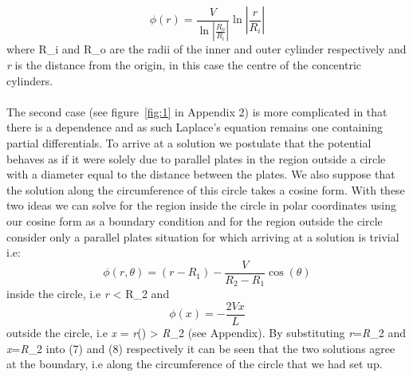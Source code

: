 \documentclass{article}
\begin{document}
\begin{equation}
\phi(r)=\frac{V}{\ln\left|\frac{R_o}{R_i}\right|}\ln\left|\frac{r}{R_i}\right|
\label{29}
\end{equation}
where R_i\) and R_o\) are the radii of the inner and outer cylinder respectively and \textit{r} is the distance from the origin, in this case the centre of the concentric cylinders. \\
\\
The second case (see figure~\ref{fig:1} in Appendix 2) is more complicated in that there is a \theta\) dependence and as such Laplace's equation remains one containing partial differentials. To arrive at a solution we postulate that the potential behaves as if it were solely due to parallel plates in the region outside a circle with a diameter equal to the distance between the plates. We also suppose that the solution along the circumference of this circle takes a cosine form. With these two ideas we can solve for the region inside the circle in polar coordinates using our cosine form as a boundary condition and for the region outside the circle consider only a parallel plates situation for which arriving at a solution is trivial i.e: 
\begin{equation}
\phi(r,\theta)=(r-R_1)-\frac{V}{R_2-R_1}\cos(\theta)
\label{}
\end{equation}
inside the circle, i.e \textit{r} < R_2\) and
\begin{equation}
\phi(x)=-\frac{2Vx}{L}
\label{}
\end{equation}
outside the circle, i.e \textit{x} = \textit{r}\cos(\theta)\) > \textit{R}_2\) (see Appendix). By substituting \textit{r}=\textit{R}_2\) and \textit{x}=\textit{R}_2\cos\theta\) into (7) and (8) respectively it can be seen that the two solutions agree at the boundary, i.e along the circumference of the circle that we had set up. 
\end{document}
